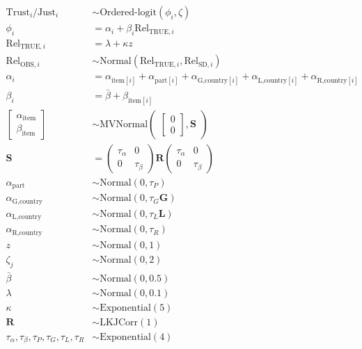 \documentclass[english,man,floatsintext]{apa6}
\begin{document}
\[
\begin{aligned}
\text{Trust}_{i}/\text{Just}_{i} &\sim \text{Ordered-logit}(\phi_{i},\zeta) \\
\phi_{i} &= \alpha_{i} + \beta_{i}\text{Rel}_{\text{TRUE},i} \\
\text{Rel}_{\text{TRUE},i} &= \lambda + \kappa z \\
\text{Rel}_{\text{OBS},i} &\sim \text{Normal}(\text{Rel}_{\text{TRUE},i}, \text{Rel}_{\text{SD},i}) \\
\alpha_{i} &= \alpha_{\text{item}[i]} + \alpha_{\text{part}[i]} + \alpha_{\text{G,country}[i]} + \alpha_{\text{L,country}[i]} + \alpha_{\text{R,country}[i]} \\
\beta_{i} &= \bar{\beta} + \beta_{\text{item}[i]} \\
\begin{bmatrix}\alpha_{\text{item}}\\
\beta_{\text{item}}\end{bmatrix} &\sim \text{MVNormal}
\begin{pmatrix}\begin{bmatrix}0\\0\end{bmatrix}, \textbf{S}
\end{pmatrix}\\
\textbf{S} &=
\begin{pmatrix}\tau_{\alpha}&0\\0&\tau_{\beta}\end{pmatrix}
\textbf{R}
\begin{pmatrix}\tau_{\alpha}&0\\0&\tau_{\beta}\end{pmatrix} \\
\alpha_{\text{part}} &\sim \text{Normal}(0, \tau_{P}) \\
\alpha_{\text{G,country}} &\sim \text{Normal}(0, \tau_{G} \textbf{G}) \\
\alpha_{\text{L,country}} &\sim \text{Normal}(0, \tau_{L} \textbf{L}) \\
\alpha_{\text{R,country}} &\sim \text{Normal}(0, \tau_{R}) \\
z &\sim \text{Normal}(0, 1)\\
\zeta_{j} &\sim \text{Normal}(0, 2)\\
\bar{\beta} &\sim \text{Normal}(0, 0.5) \\
\lambda &\sim \text{Normal}(0, 0.1) \\
\kappa &\sim \text{Exponential}(5) \\
\textbf{R} &\sim \text{LKJCorr}(1)\\
\tau_{\alpha},\tau_{\beta},\tau_{P},\tau_{G},\tau_{L},\tau_{R} &\sim \text{Exponential}(4) \\
\end{aligned}
\]
\end{document}
